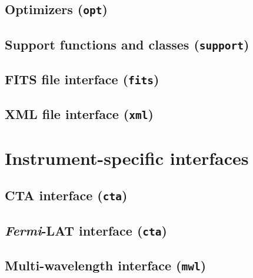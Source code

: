 \documentclass{article}[12pt,a4]
\begin{document}
\subsection{Optimizers ({\tt opt})}
\label{sec:opt}

\subsection{Support functions and classes ({\tt support})}
\label{sec:support}


\subsection{FITS file interface ({\tt fits})}
\label{sec:fits}


\subsection{XML file interface ({\tt xml})}
\label{sec:xml}


\clearpage
\section{Instrument-specific interfaces}
\label{sec:inst}

\subsection{CTA interface ({\tt cta})}
\label{sec:cta}


\subsection{{\em Fermi}-LAT interface ({\tt cta})}
\label{sec:lat}


\subsection{Multi-wavelength interface ({\tt mwl})}
\label{sec:mwl}
\end{document}
